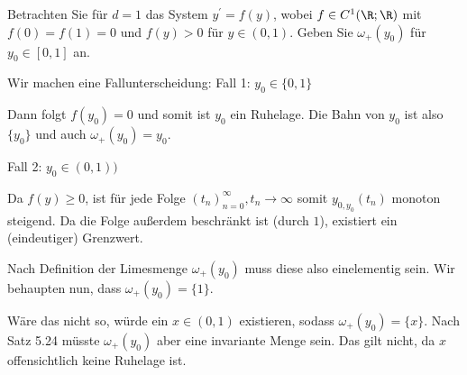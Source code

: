 \begin{exercise}
Betrachten Sie für $d = 1$ das System $y^{\prime} = f(y)$, wobei $f \in C^1(\R;\R)$
mit $f(0) = f(1) = 0$ und $f(y) > 0$ für $y \in (0,1)$. Geben Sie $\omega_+(y_0)$
für $y_0 \in [0,1]$ an.
\end{exercise}
\begin{solution}
Wir machen eine Fallunterscheidung:
Fall 1: $y_0 \in \{0,1\}$

Dann folgt $f(y_0)=0$ und somit ist $y_0$ ein Ruhelage. Die Bahn von $y_0$ ist also $\{y_0\}$ und auch $\omega_+ (y_0) = {y_0}$.

Fall 2: $y_0 \in (0,1))$

Da $f(y) \geq 0$, ist für jede Folge $(t_n)_{n=0}^{\infty}, t_n \to \infty$ somit $y_{0,y_0}(t_n)$ monoton steigend. Da die Folge außerdem beschränkt ist (durch $1$), existiert ein (eindeutiger) Grenzwert.

Nach Definition der Limesmenge $\omega_+ (y_0)$ muss diese also einelementig sein.
Wir behaupten nun, dass $\omega_+ (y_0)=\{1\}$.

Wäre das nicht so, würde ein $x \in (0,1)$ existieren, sodass  $\omega_+ (y_0)=\{x\}$. Nach Satz 5.24 müsste $\omega_+ (y_0)$ aber eine invariante Menge sein. Das gilt nicht, da $x$ offensichtlich keine Ruhelage ist.
\end{solution}

